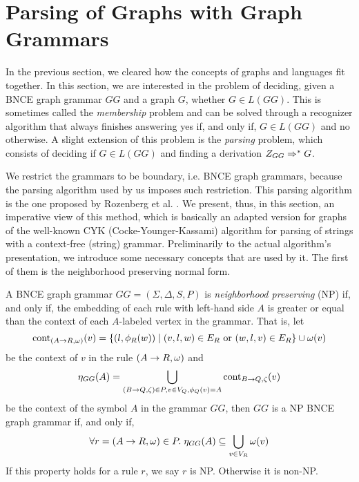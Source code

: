 \section{Parsing of Graphs with Graph Grammars}
\label{sec:parsing}
In the previous section, we cleared how the concepts of graphs and languages fit together. In this section, we are interested in the problem of deciding, given a BNCE graph grammar $GG$ and a graph $G$, whether $G \in L(GG)$. This is sometimes called the \textit{membership} problem and can be solved through a recognizer algorithm that always finishes answering yes if, and only if, $G \in L(GG)$ and no otherwise. A slight extension of this problem is the \textit{parsing} problem, which consists of deciding if $G \in L(GG)$ and finding a derivation $Z_{GG} \Rightarrow^*_{} G$.

We restrict the grammars to be boundary, i.e. BNCE graph grammars, because the parsing algorithm used by us imposes such restriction. This parsing algorithm is the one proposed by Rozenberg et al. \citep{rozenberg1986boundary}. We present, thus, in this section, an imperative view of this method, which is basically an adapted version for graphs of the well-known CYK (Cocke-Younger-Kassami) algorithm for parsing of strings with a context-free (string) grammar. Preliminarily to the actual algorithm's presentation, we introduce some necessary concepts that are used by it. The first of them is the neighborhood preserving normal form.

\begin{definition}
	\label{def:np}
	A BNCE graph grammar $GG = (\Sigma, \Delta, S, P)$ is \emph{neighborhood preserving} (NP) if, and only if, the embedding of each rule with left-hand side $A$ is greater or equal than the context of each $A$-labeled vertex in the grammar. That is, let 
	\begin{equation*}
		\operatorname{cont}_{(A \to R,\omega)}(v) =\{(l,\phi_{R}(w)) \; | \; (v,l,w) \in E_R \text { or } (w,l,v) \in E_R \} \cup \omega(v)
	\end{equation*}
	be the context of $v$ in the rule $(A \to R,\omega)$ and
	\begin{equation*}
		\eta_{GG}(A) = \bigcup_{(B \to Q,\zeta) \in P, v \in V_Q, \phi_Q(v) = A} \operatorname{cont}_{B \to Q,\zeta}(v)
	\end{equation*}
	be the context of the symbol $A$ in the grammar $GG$, then $GG$ is a NP BNCE graph grammar if, and only if,
	\begin{equation*}
		\forall r = (A \to R,\omega) \in P . \; \eta_{GG}(A) \subseteq \bigcup_{v \in V_R} \omega(v)
	\end{equation*}
	If this property holds for a rule $r$, we say $r$ is NP. Otherwise it is non-NP.
\end{definition}

